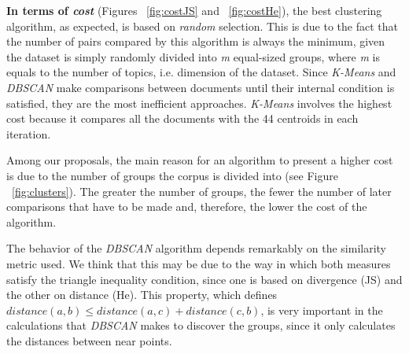 \textbf{In terms of \textit{cost}} (Figures ~\ref{fig:costJS} and ~\ref{fig:costHe}), the best clustering algorithm, as expected, is based on \textit{random} selection. This is due to the fact that the number of pairs compared by this algorithm is always the minimum, given the dataset is simply randomly divided into \textit{m} equal-sized groups, where \textit{m} is equals to the number of topics, i.e. dimension of the dataset. Since \textit{K-Means} and \textit{DBSCAN} make comparisons between documents until their internal condition is satisfied, they are the most inefficient approaches. \textit{K-Means} involves the highest cost because it compares all the documents with the 44 centroids in each iteration.

Among our proposals, the main reason for an algorithm to present a higher cost is due to the number of groups the corpus is divided into (see Figure ~\ref{fig:clusters}). The greater the number of groups, the fewer the number of later comparisons that have to be made and, therefore, the lower the cost of the algorithm.

The behavior of the \textit{DBSCAN} algorithm depends remarkably on the similarity metric used. We think that this may be due to the way in which both measures satisfy the triangle inequality condition, since one is based on divergence (JS) and the other on distance (He). This property, which defines $distance(a,b) \leq distance(a,c) + distance(c,b)$, is very important in the calculations that \textit{DBSCAN} makes to discover the groups, since it only calculates the distances between near points.

